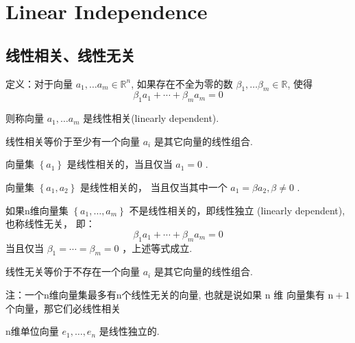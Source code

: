 \chapter{Linear Independence}

\section{线性相关、线性无关}

\begin{definition}
    定义：对于向量 $ a_{1}, \ldots a_{m} \in \mathbb{R}^{n} $, 如果存在不全为零的数 $ \beta_{1}, \ldots \beta_{m} \in \mathbb{R} $, 使得
$$
\beta_{1} a_{1}+\cdots+\beta_{m} a_{m}=0
$$

则称向量 $ a_{1}, \ldots a_{m} $ 是线性相关(linearly dependent). 
\end{definition}

线性相关等价于至少有一个向量 $ a_{i} $ 是其它向量的线性组合. 

\begin{corollary}
    向量集 $ \left\{a_{1}\right\} $ 是线性相关的，当且仅当 $ a_{1}=0 $ . 

    向量集 $ \left\{a_{1}, a_{2}\right\} $ 是线性相关的， 当且仅当其中一个 $ a_{1}=\beta a_{2}, \beta \neq 0 $ . 
\end{corollary}

\begin{definition}
    如果n维向量集 $ \left\{a_{1}, \ldots, a_{m}\right\} $ 不是线性相关的，即线性独立 (linearly dependent), 也称线性无关， 即：
$$
\beta_{1} a_{1}+\cdots+\beta_{m} a_{m}=0
$$
当且仅当 $ \beta_{1}=\cdots=\beta_{m}=0 $ ，上述等式成立. 
\end{definition}

线性无关等价于不存在一个向量 $ a_{i} $ 是其它向量的线性组合. 

\begin{corollary}
    注：一个n维向量集最多有n个线性无关的向量, 也就是说如果 $ \mathrm{n} $ 维 向量集有 $ \mathrm{n}+1 $ 个向量，那它们必线性相关
\end{corollary}

\begin{example}
    n维单位向量 $ e_{1}, \ldots, e_{n} $ 是线性独立的. 
\end{example}

